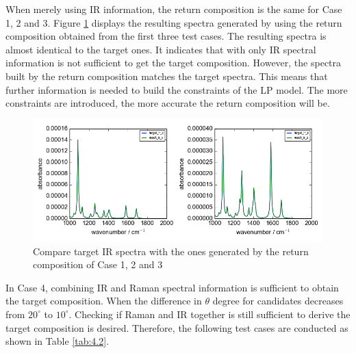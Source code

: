When merely using IR information, the return composition is the same for Case 1, 2 and 3. Figure \ref{fig:4.1} displays the resulting spectra generated by using the return composition obtained from the first three test cases. The resulting spectra is almost identical to the target ones. It indicates that with only IR spectral information is not sufficient to get the target composition.  However, the spectra built by the return composition matches the target spectra. This means that further information is needed to build the constraints of the LP model. The more constraints are introduced, the more accurate the return composition will be. \\

\begin{figure}[!ht]
\centering
\includegraphics[scale=0.7]{Figures/ir_xz_result_plotting_remove_space.png}
\caption{Compare target IR spectra with the ones generated by the return composition of Case 1, 2 and 3}  \label{fig:4.1}
\end{figure}

In Case 4, combining IR and Raman spectral information is sufficient to obtain the target composition. When the difference in $\theta$ degree for candidates decreases from $20^{\circ}$ to $10^{\circ}$. Checking if Raman and IR together is still sufficient to derive the target composition is desired. Therefore, the following test cases are conducted as shown in Table \ref{tab:4.2}. \\

